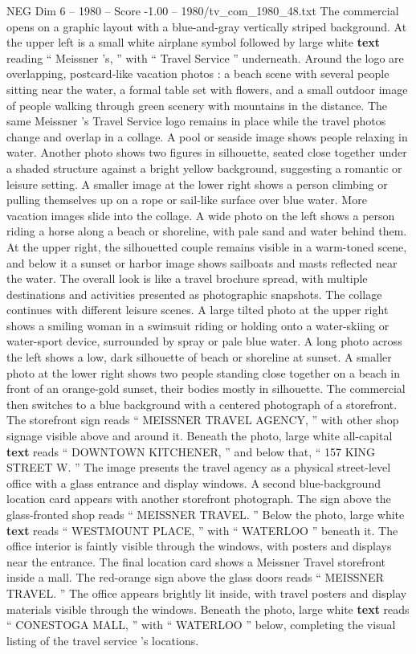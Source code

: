 \begin{textsample}{NEG Dim 6 – 1980 – Score -1.00 – 1980/tv\_com\_1980\_48.txt}  \label{ex:f6_neg_061}
The commercial opens on a graphic layout with a blue-and-gray vertically striped background.
At the upper left is a small white airplane symbol followed by large white \textbf{text} reading “ Meissner ’s, ” with “ Travel Service ” underneath.
Around the logo are overlapping, postcard-like vacation photos : a beach scene with several people sitting near the water, a formal table set with flowers, and a small outdoor image of people walking through green scenery with mountains in the distance.
The same Meissner ’s Travel Service logo remains in place while the travel photos change and overlap in a collage.
A pool or seaside image shows people relaxing in water.
Another photo shows two figures in silhouette, seated close together under a shaded structure against a bright yellow background, suggesting a romantic or leisure setting.
A smaller image at the lower right shows a person climbing or pulling themselves up on a rope or sail-like surface over blue water.
More vacation images slide into the collage.
A wide photo on the left shows a person riding a horse along a beach or shoreline, with pale sand and water behind them.
At the upper right, the silhouetted couple remains visible in a warm-toned scene, and below it a sunset or harbor image shows sailboats and masts reflected near the water.
The overall look is like a travel brochure spread, with multiple destinations and activities presented as photographic snapshots.
The collage continues with different leisure scenes.
A large tilted photo at the upper right shows a smiling woman in a swimsuit riding or holding onto a water-skiing or water-sport device, surrounded by spray or pale blue water.
A long photo across the left shows a low, dark silhouette of beach or shoreline at sunset.
A smaller photo at the lower right shows two people standing close together on a beach in front of an orange-gold sunset, their bodies mostly in silhouette.
The commercial then switches to a blue background with a centered photograph of a storefront.
The storefront sign reads “ MEISSNER TRAVEL AGENCY, ” with other shop signage visible above and around it.
Beneath the photo, large white all-capital \textbf{text} reads “ DOWNTOWN KITCHENER, ” and below that, “ 157 KING STREET W. ” The image presents the travel agency as a physical street-level office with a glass entrance and display windows.
A second blue-background location card appears with another storefront photograph.
The sign above the glass-fronted shop reads “ MEISSNER TRAVEL. ” Below the photo, large white \textbf{text} reads “ WESTMOUNT PLACE, ” with “ WATERLOO ” beneath it.
The office interior is faintly visible through the windows, with posters and displays near the entrance.
The final location card shows a Meissner Travel storefront inside a mall.
The red-orange sign above the glass doors reads “ MEISSNER TRAVEL. ” The office appears brightly lit inside, with travel posters and display materials visible through the windows.
Beneath the photo, large white \textbf{text} reads “ CONESTOGA MALL, ” with “ WATERLOO ” below, completing the visual listing of the travel service ’s locations.

\end{textsample}
